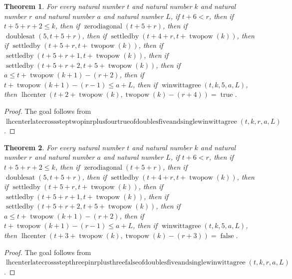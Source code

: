\documentclass[11pt]{article}
\newtheorem{theorem}{Theorem}[section]
\theoremstyle{definition}
\begin{document}
\begin{theorem}
\label{ll:paper:lhcenter-late-cross-step-two-pin-r-plus-four-true-of-doubles-five-and-single-winwittagree}
For every natural number \(t\) and natural number \(k\) and natural number \(r\) and natural number \(a\) and natural number \(L\), if \(t + 6 < r\), then if \(t + 5 + r + 2 \le k\), then if \(\operatorname{zerodiagonal}(t + 5 + r)\), then if \(\operatorname{doublesat}(5, t + 5 + r)\), then if \(\operatorname{settledby}(t + 4 + r, t + \operatorname{twopow}(k))\), then if \(\operatorname{settledby}(t + 5 + r, t + \operatorname{twopow}(k))\), then if \(\operatorname{settledby}(t + 5 + r + 1, t + \operatorname{twopow}(k))\), then if \(\operatorname{settledby}(t + 5 + r + 2, t + 5 + \operatorname{twopow}(k))\), then if \(a \le t + \operatorname{twopow}(k + 1) - (r + 2)\), then if \(t + \operatorname{twopow}(k + 1) - (r - 1) \le a + L\), then if \(\operatorname{winwittagree}(t, k, 5, a, L)\), then \(\operatorname{lhcenter}(t + 2 + \operatorname{twopow}(k), \operatorname{twopow}(k) - (r + 4)) = \operatorname{true}\).
\end{theorem}
\begin{proof}
The goal follows from \(\operatorname{lhcenterlatecrosssteptwopinrplusfourtrueofdoublesfiveandsinglewinwittagree}(t, k, r, a, L)\).
\end{proof}
\begin{theorem}
\label{ll:paper:lhcenter-late-cross-step-three-pin-r-plus-three-false-of-doubles-five-and-single-winwittagree}
For every natural number \(t\) and natural number \(k\) and natural number \(r\) and natural number \(a\) and natural number \(L\), if \(t + 6 < r\), then if \(t + 5 + r + 2 \le k\), then if \(\operatorname{zerodiagonal}(t + 5 + r)\), then if \(\operatorname{doublesat}(5, t + 5 + r)\), then if \(\operatorname{settledby}(t + 4 + r, t + \operatorname{twopow}(k))\), then if \(\operatorname{settledby}(t + 5 + r, t + \operatorname{twopow}(k))\), then if \(\operatorname{settledby}(t + 5 + r + 1, t + \operatorname{twopow}(k))\), then if \(\operatorname{settledby}(t + 5 + r + 2, t + 5 + \operatorname{twopow}(k))\), then if \(a \le t + \operatorname{twopow}(k + 1) - (r + 2)\), then if \(t + \operatorname{twopow}(k + 1) - (r - 1) \le a + L\), then if \(\operatorname{winwittagree}(t, k, 5, a, L)\), then \(\operatorname{lhcenter}(t + 3 + \operatorname{twopow}(k), \operatorname{twopow}(k) - (r + 3)) = \operatorname{false}\).
\end{theorem}
\begin{proof}
The goal follows from \(\operatorname{lhcenterlatecrossstepthreepinrplusthreefalseofdoublesfiveandsinglewinwittagree}(t, k, r, a, L)\).
\end{proof}
\end{document}
